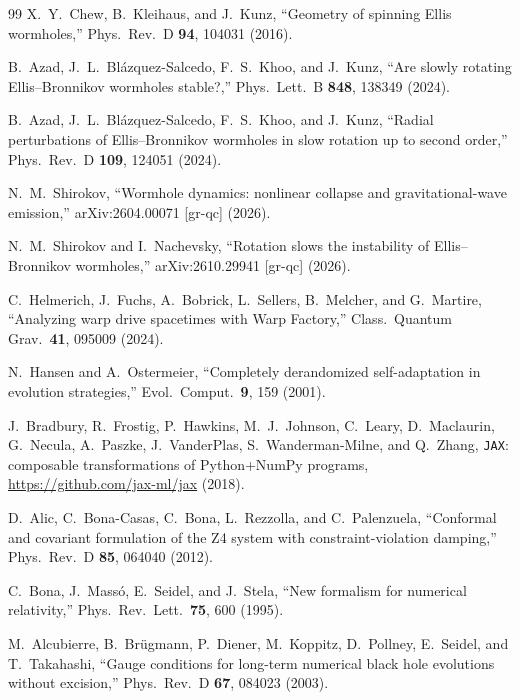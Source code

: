 \documentclass[twocolumn,floatfix,aps,prd,superscriptaddress,nofootinbib]{revtex4-2}
\begin{document}
\begin{thebibliography}{99}
X.~Y.~Chew, B.~Kleihaus, and J.~Kunz,
\newblock ``Geometry of spinning Ellis wormholes,''
\newblock Phys.\ Rev.\ D \textbf{94}, 104031 (2016).

B.~Azad, J.~L.~Bl\'azquez-Salcedo, F.~S.~Khoo, and J.~Kunz,
\newblock ``Are slowly rotating Ellis--Bronnikov wormholes stable?,''
\newblock Phys.\ Lett.\ B \textbf{848}, 138349 (2024).

B.~Azad, J.~L.~Bl\'azquez-Salcedo, F.~S.~Khoo, and J.~Kunz,
\newblock ``Radial perturbations of Ellis--Bronnikov wormholes in slow rotation up to second order,''
\newblock Phys.\ Rev.\ D \textbf{109}, 124051 (2024).

N.~M.~Shirokov,
\newblock ``Wormhole dynamics: nonlinear collapse and gravitational-wave emission,''
\newblock arXiv:2604.00071 [gr-qc] (2026).

N.~M.~Shirokov and I.~Nachevsky,
\newblock ``Rotation slows the instability of Ellis--Bronnikov wormholes,''
\newblock arXiv:2610.29941 [gr-qc] (2026).

C.~Helmerich, J.~Fuchs, A.~Bobrick, L.~Sellers, B.~Melcher, and G.~Martire,
\newblock ``Analyzing warp drive spacetimes with Warp Factory,''
\newblock Class.\ Quantum Grav.\ \textbf{41}, 095009 (2024).

N.~Hansen and A.~Ostermeier,
\newblock ``Completely derandomized self-adaptation in evolution strategies,''
\newblock Evol.\ Comput.\ \textbf{9}, 159 (2001).

J.~Bradbury, R.~Frostig, P.~Hawkins, M.~J.~Johnson, C.~Leary, D.~Maclaurin, G.~Necula, A.~Paszke, J.~VanderPlas, S.~Wanderman-Milne, and Q.~Zhang,
\newblock \texttt{JAX}: composable transformations of Python+NumPy programs,
\newblock \url{https://github.com/jax-ml/jax} (2018).

D.~Alic, C.~Bona-Casas, C.~Bona, L.~Rezzolla, and C.~Palenzuela,
\newblock ``Conformal and covariant formulation of the Z4 system with constraint-violation damping,''
\newblock Phys.\ Rev.\ D \textbf{85}, 064040 (2012).

C.~Bona, J.~Mass\'o, E.~Seidel, and J.~Stela,
\newblock ``New formalism for numerical relativity,''
\newblock Phys.\ Rev.\ Lett.\ \textbf{75}, 600 (1995).

M.~Alcubierre, B.~Br\"ugmann, P.~Diener, M.~Koppitz, D.~Pollney, E.~Seidel, and T.~Takahashi,
\newblock ``Gauge conditions for long-term numerical black hole evolutions without excision,''
\newblock Phys.\ Rev.\ D \textbf{67}, 084023 (2003).


\end{thebibliography}
\end{document}
